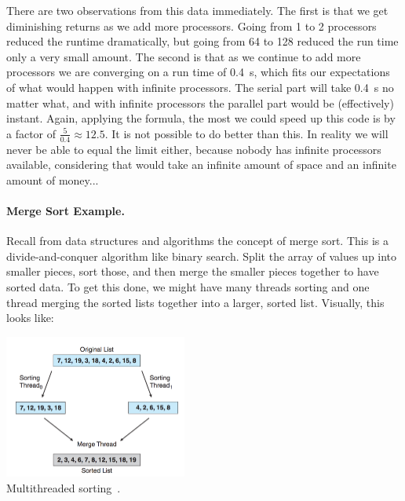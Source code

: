 There are two observations from this data immediately. The first is that we get diminishing returns as we add more processors. Going from 1 to 2 processors reduced the runtime dramatically, but going from 64 to 128 reduced the run time only a very small amount. The second is that as we continue to add more processors we are converging on a run time of 0.4~s, which fits our expectations of what would happen with infinite processors. The serial part will take 0.4~s no matter what, and with infinite processors the parallel part would be (effectively) instant. Again, applying the formula, the most we could speed up this code is by a factor of $\frac{5}{0.4}\approx 12.5$. It is not possible to do better than this. In reality we will never be able to equal the limit either, because nobody has infinite processors available, considering that would take an infinite amount of space and an infinite amount of money...

\paragraph{Merge Sort Example.}
Recall from data structures and algorithms the concept of merge sort. This is a divide-and-conquer algorithm like binary search. Split the array of values up into smaller pieces, sort those, and then merge the smaller pieces together to have sorted data. To get this done, we might have many threads sorting and one thread merging the sorted lists together into a larger, sorted list. Visually, this looks like:

\begin{center}
	\includegraphics[width=0.45\textwidth]{images/multithread-sort.png}\\
	Multithreaded sorting~\cite{osc}.
\end{center}




